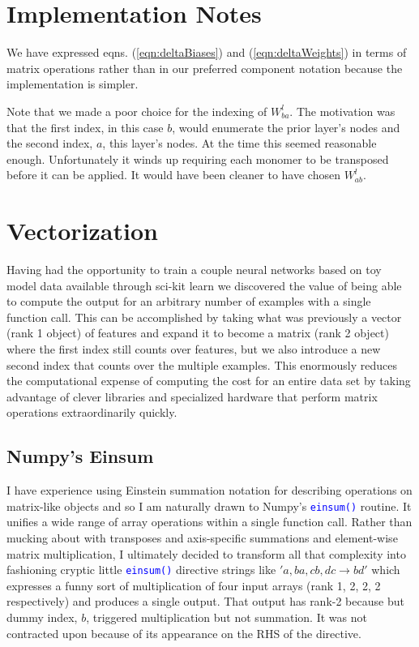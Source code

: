 \documentclass[twocolumn]{revtex4-1}
\newcommand{\code}[1]{\textcolor{blue}{\lstinline{#1}}}
\begin{document}
\section{Implementation Notes}
We have expressed eqns. (\ref{eqn:deltaBiases}) and (\ref{eqn:deltaWeights}) in terms of matrix operations rather than in our preferred component notation because the implementation is simpler.

Note that we made a poor choice for the indexing of $W^l_{b a}$. The motivation was that the first index, in this case $b$, would enumerate the prior layer's nodes and the second index, $a$, this layer's nodes. At the time this seemed reasonable enough. Unfortunately it winds up requiring each monomer to be transposed before it can be applied. It would have been cleaner to have chosen $W^l_{a b}$.

\section{Vectorization}
Having had the opportunity to train a couple neural networks based on toy model data available through sci-kit learn we discovered the value of being able to compute the output for an arbitrary number of examples with a single function call. This can be accomplished by taking what was previously a vector (rank 1 object) of features and expand it to become a matrix (rank 2 object) where the first index still counts over features, but we also introduce a new second index that counts over the multiple examples. This enormously reduces the computational expense of computing the cost for an entire data set by taking advantage of clever libraries and specialized hardware that perform matrix operations extraordinarily quickly.

\subsection{Numpy's Einsum}
I have experience using Einstein summation notation for describing operations on matrix-like objects and so I am naturally drawn to Numpy's \code{einsum()} routine. It unifies a wide range of array operations within a single function call. Rather than mucking about with transposes and axis-specific summations and element-wise matrix multiplication, I ultimately decided to transform all that complexity into fashioning cryptic little \code{einsum()} directive strings like $'a, ba, cb, dc \rightarrow bd'$ which expresses a funny sort of multiplication of four input arrays (rank 1, 2, 2, 2 respectively) and produces a single output. That output has rank-2 because but dummy index, $b$, triggered multiplication but not summation. It was not contracted upon because of its appearance on the RHS of the directive.
\end{document}

